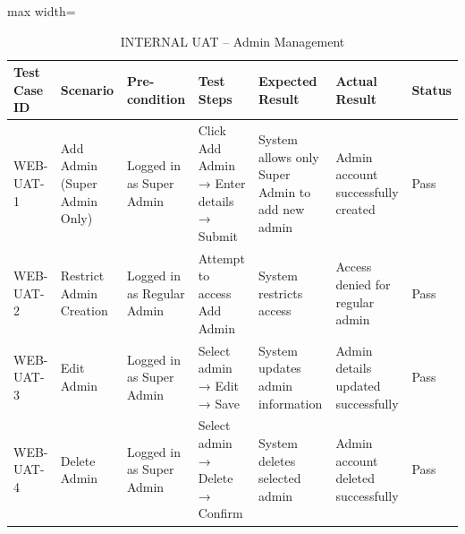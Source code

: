 {	\begin{table}[H]
		\centering
		\caption{INTERNAL UAT – Admin Management}
		\renewcommand{\arraystretch}{1.2}
		\begin{adjustbox}{max width=\textwidth}
			\begin{tabular}{p{2cm}p{3cm}p{3cm}p{3cm}p{4cm}p{4cm}p{1.5cm}}
				\toprule
				\textbf{Test Case ID} & \textbf{Scenario} & \textbf{Pre-condition} & \textbf{Test Steps} & \textbf{Expected Result} & \textbf{Actual Result} & \textbf{Status} \\
				\midrule
				WEB-UAT-1 & Add Admin (Super Admin Only) & Logged in as Super Admin & Click Add Admin → Enter details → Submit & System allows only Super Admin to add new admin & Admin account successfully created & Pass \\
				WEB-UAT-2 & Restrict Admin Creation & Logged in as Regular Admin & Attempt to access Add Admin & System restricts access & Access denied for regular admin & Pass \\
				WEB-UAT-3 & Edit Admin & Logged in as Super Admin & Select admin → Edit → Save & System updates admin information & Admin details updated successfully & Pass \\
				WEB-UAT-4 & Delete Admin & Logged in as Super Admin & Select admin → Delete → Confirm & System deletes selected admin & Admin account deleted successfully & Pass \\
				\bottomrule
			\end{tabular}
		\end{adjustbox}
	\end{table}
	
}
